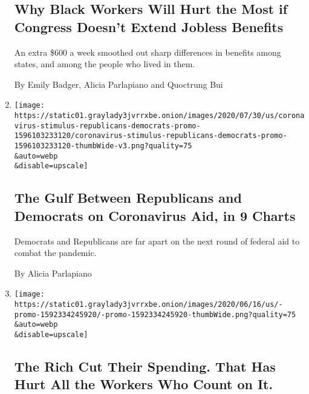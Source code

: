 \begin{enumerate}
  \hypertarget{why-black-workers-will-hurt-the-most-if-congress-doesnt-extend-jobless-benefits}{%
  \subsection{Why Black Workers Will Hurt the Most if Congress Doesn't
  Extend Jobless
  Benefits}\label{why-black-workers-will-hurt-the-most-if-congress-doesnt-extend-jobless-benefits}}

  An extra \$600 a week smoothed out sharp differences in benefits among
  states, and among the people who lived in them.

  By Emily Badger, Alicia Parlapiano and Quoctrung Bui
\item
  \href{/interactive/2020/07/30/upshot/coronavirus-stimulus-bill.html}{}

  \texttt{[image: https://static01.graylady3jvrrxbe.onion/images/2020/07/30/us/coronavirus-stimulus-republicans-democrats-promo-1596103233120/coronavirus-stimulus-republicans-democrats-promo-1596103233120-thumbWide-v3.png?quality=75\\\&auto=webp\\\&disable=upscale]}

  \hypertarget{the-gulf-between-republicans-and-democrats-on-coronavirus-aid-in-9-charts}{%
  \subsection{The Gulf Between Republicans and Democrats on Coronavirus
  Aid, in 9
  Charts}\label{the-gulf-between-republicans-and-democrats-on-coronavirus-aid-in-9-charts}}

  Democrats and Republicans are far apart on the next round of federal
  aid to combat the pandemic.

  By Alicia Parlapiano
\item
  \href{/2020/06/17/upshot/coronavirus-spending-rich-poor.html}{}

  \texttt{[image: https://static01.graylady3jvrrxbe.onion/images/2020/06/16/us/-promo-1592334245920/-promo-1592334245920-thumbWide.png?quality=75\\\&auto=webp\\\&disable=upscale]}

  \hypertarget{the-rich-cut-their-spending-that-has-hurt-all-the-workers-who-count-on-it}{%
  \subsection{The Rich Cut Their Spending. That Has Hurt All the Workers
  Who Count on
  It.}\label{the-rich-cut-their-spending-that-has-hurt-all-the-workers-who-count-on-it}}


\end{enumerate}
